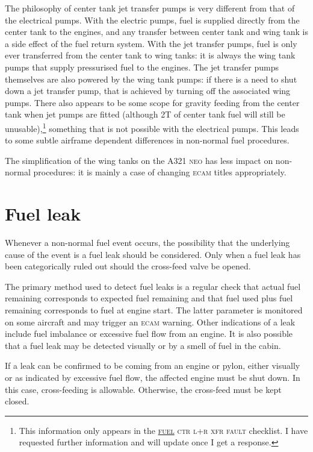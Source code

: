 \documentclass[a5paper,11pt,twoside]{book}
\newcommand{\ac}[1]{{\scshape\MakeLowercase{#1}}}
\newcommand{\ecam}[2]{{\ac{\uline{#1} #2}}}
\begin{document}
The philosophy of center tank jet transfer pumps is very different from that of
the electrical pumps. With the electric pumps, fuel is supplied directly from
the center tank to the engines, and any transfer between center tank and wing
tank is a side effect of the fuel return system. With the jet transfer pumps,
fuel is only ever transferred from the center tank to wing tanks: it is always
the wing tank pumps that supply pressurised fuel to the engines. The jet
transfer pumps themselves are also powered by the wing tank pumps: if there is a
need to shut down a jet transfer pump, that is achieved by turning off the
associated wing pumps. There also appears to be some scope for gravity feeding
from the center tank when jet pumps are fitted (although 2T of center tank fuel
will still be unusable),\footnote{This information only appears in the
\ecam{FUEL}{CTR L+R XFR FAULT} checklist. I have requested further information
and will update once I get a response.} something that is not possible with the
electrical pumps. This leads to some subtle airframe dependent differences in
non-normal fuel procedures.

The simplification of the wing tanks on the A321 \ac{NEO} has less impact on non-normal
procedures: it is mainly a case of changing \ac{ECAM} titles appropriately.


\section{Fuel leak}

Whenever a non-normal fuel event occurs, the possibility that the underlying
cause of the event is a fuel leak should be considered. Only when a fuel leak
has been categorically ruled out should the cross-feed valve be opened.

The primary method used to detect fuel leaks is a regular check that actual fuel
remaining corresponds to expected fuel remaining and that fuel used plus fuel
remaining corresponds to fuel at engine start. The latter parameter is monitored
on some aircraft and may trigger an \ac{ECAM} warning. Other indications of a
leak include fuel imbalance or excessive fuel flow from an engine. It is also
possible that a fuel leak may be detected visually or by a smell of fuel in the
cabin.

If a leak can be confirmed to be coming from an engine or pylon, either visually
or as indicated by excessive fuel flow, the affected engine must be shut
down. In this case, cross-feeding is allowable. Otherwise, the cross-feed must
be kept closed.
\end{document}
